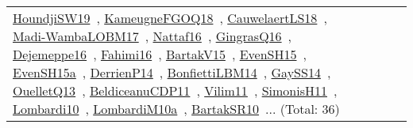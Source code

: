 {\begin{longtable}{lp{3cm}>{\raggedright\arraybackslash}p{6cm}>{\raggedright\arraybackslash}p{6cm}>{\raggedright\arraybackslash}p{8cm}}
\href{works/HoundjiSW19.pdf}{HoundjiSW19}~\cite{HoundjiSW19}, \href{works/KameugneFGOQ18.pdf}{KameugneFGOQ18}~\cite{KameugneFGOQ18}, \href{works/CauwelaertLS18.pdf}{CauwelaertLS18}~\cite{CauwelaertLS18}, \href{works/Madi-WambaLOBM17.pdf}{Madi-WambaLOBM17}~\cite{Madi-WambaLOBM17}, \href{works/Nattaf16.pdf}{Nattaf16}~\cite{Nattaf16}, \href{works/GingrasQ16.pdf}{GingrasQ16}~\cite{GingrasQ16}, \href{works/Dejemeppe16.pdf}{Dejemeppe16}~\cite{Dejemeppe16}, \href{works/Fahimi16.pdf}{Fahimi16}~\cite{Fahimi16}, \href{works/BartakV15.pdf}{BartakV15}~\cite{BartakV15}, \href{works/EvenSH15.pdf}{EvenSH15}~\cite{EvenSH15}, \href{works/EvenSH15a.pdf}{EvenSH15a}~\cite{EvenSH15a}, \href{works/DerrienP14.pdf}{DerrienP14}~\cite{DerrienP14}, \href{works/BonfiettiLBM14.pdf}{BonfiettiLBM14}~\cite{BonfiettiLBM14}, \href{works/GaySS14.pdf}{GaySS14}~\cite{GaySS14}, \href{works/OuelletQ13.pdf}{OuelletQ13}~\cite{OuelletQ13}, \href{works/BeldiceanuCDP11.pdf}{BeldiceanuCDP11}~\cite{BeldiceanuCDP11}, \href{works/Vilim11.pdf}{Vilim11}~\cite{Vilim11}, \href{works/SimonisH11.pdf}{SimonisH11}~\cite{SimonisH11}, \href{works/Lombardi10.pdf}{Lombardi10}~\cite{Lombardi10}, \href{works/LombardiM10a.pdf}{LombardiM10a}~\cite{LombardiM10a}, \href{works/BartakSR10.pdf}{BartakSR10}~\cite{BartakSR10}... (Total: 36)\\

\end{longtable}}
